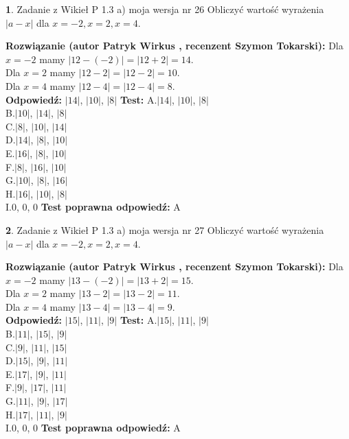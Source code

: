 \documentclass[12pt, a4paper]{article}
\theoremstyle{definition} %
\newtheorem{zad}{}
\newcommand{\zadStart}[1]{\begin{zad}#1\newline}
\newcommand{\zadStop}{\end{zad}}
\newcommand{\rozwStart}[2]{\noindent \textbf{Rozwiązanie (autor #1 , recenzent #2): }\newline}
\newcommand{\rozwStop}{\newline}
\newcommand{\odpStart}{\noindent \textbf{Odpowiedź:}\newline}
\newcommand{\odpStop}{\newline}
\newcommand{\testStart}{\noindent \textbf{Test:}\newline}
\newcommand{\testStop}{\newline}
\newcommand{\kluczStart}{\noindent \textbf{Test poprawna odpowiedź:}\newline}
\newcommand{\kluczStop}{\newline}
\begin{document}
\zadStart{Zadanie z Wikieł P 1.3 a) moja wersja nr 26}
Obliczyć wartość wyrażenia $|a - x|$ dla $x=-2,x=2,x=4$.
\zadStop
\rozwStart{Patryk Wirkus}{Szymon Tokarski}
Dla $x = -2$ mamy $|12 - (-2)| = |12 + 2| = 14$.\\
Dla $x = 2$ mamy $|12 - 2| = |12 - 2| = 10$.\\
Dla $x = 4$ mamy $|12 - 4| = |12 - 4| = 8$.\\
\rozwStop
\odpStart
$|14|$, $|10|$, $|8|$
\odpStop
\testStart
A.$|14|$, $|10|$, $|8|$\\
B.$|10|$, $|14|$, $|8|$\\
C.$|8|$, $|10|$, $|14|$\\
D.$|14|$, $|8|$, $|10|$\\
E.$|16|$, $|8|$, $|10|$\\
F.$|8|$, $|16|$, $|10|$\\
G.$|10|$, $|8|$, $|16|$\\
H.$|16|$, $|10|$, $|8|$\\
I.$0$, $0$, $0$
\testStop
\kluczStart
A
\kluczStop



\zadStart{Zadanie z Wikieł P 1.3 a) moja wersja nr 27}
Obliczyć wartość wyrażenia $|a - x|$ dla $x=-2,x=2,x=4$.
\zadStop
\rozwStart{Patryk Wirkus}{Szymon Tokarski}
Dla $x = -2$ mamy $|13 - (-2)| = |13 + 2| = 15$.\\
Dla $x = 2$ mamy $|13 - 2| = |13 - 2| = 11$.\\
Dla $x = 4$ mamy $|13 - 4| = |13 - 4| = 9$.\\
\rozwStop
\odpStart
$|15|$, $|11|$, $|9|$
\odpStop
\testStart
A.$|15|$, $|11|$, $|9|$\\
B.$|11|$, $|15|$, $|9|$\\
C.$|9|$, $|11|$, $|15|$\\
D.$|15|$, $|9|$, $|11|$\\
E.$|17|$, $|9|$, $|11|$\\
F.$|9|$, $|17|$, $|11|$\\
G.$|11|$, $|9|$, $|17|$\\
H.$|17|$, $|11|$, $|9|$\\
I.$0$, $0$, $0$
\testStop
\kluczStart
A
\kluczStop
\end{document}
